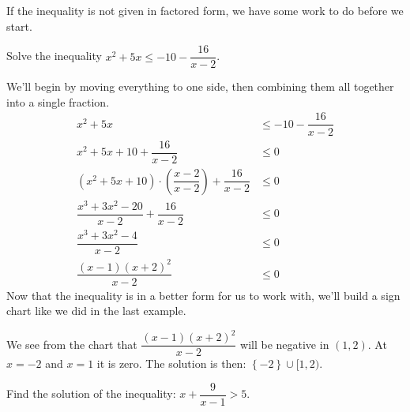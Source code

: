 \documentclass{ximera}
\begin{document}
If the inequality is not given in factored form, we have some work to do before we start.
\begin{example}
	Solve the inequality $\displaystyle x^2 + 5x \leq -10 -\dfrac{16}{x-2}$.
	\begin{explanation}
		We'll begin by moving everything to one side, then combining them all together into a single fraction.
		\begin{align*}
			x^2 + 5x &\leq -10 -\dfrac{16}{x-2}\\
			x^2 + 5x +10 +\dfrac{16}{x-2} &\leq 0\\
			\left(x^2+5x+10\right) \cdot \left(\dfrac{x-2}{x-2}\right) +\dfrac{16}{x-2} &\leq 0\\
			\dfrac{x^3+3x^2-20}{x-2} + \dfrac{16}{x-2} &\leq 0\\
			\dfrac{x^3+3x^2-4}{x-2} &\leq 0\\
			\dfrac{(x-1)(x+2)^2}{x-2} &\leq 0
		\end{align*}
		Now that the inequality is in a better form for us to work with, we'll build a sign chart like we did in the last example.


		We see from the chart that $\displaystyle \dfrac{(x-1)(x+2)^2}{x-2}$ will be negative in $(1,2)$.  At $x=-2$ and $x=1$ it is zero.
		The solution is then: $\left\{ -2\right\} \cup [ 1, 2 )$.
	\end{explanation}
\end{example}


\begin{question}
	Find the solution of the inequality: $\displaystyle x + \dfrac{9}{x-1} > 5$.
	\begin{multipleChoice}
		\choice{$[-1,\infty)$}
		\choice{$\{-1\} \cup [2,\infty)$}
	\end{multipleChoice}
\end{question}
\end{document}
